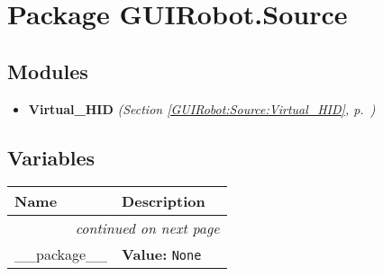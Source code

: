 %
%
%


\section{Package GUIRobot.Source}

    \label{GUIRobot:Source}


\subsection{Modules}

\begin{itemize}
\setlength{\parskip}{0ex}
\item \textbf{Virtual\_HID}
  \textit{(Section \ref{GUIRobot:Source:Virtual_HID}, p.~\pageref{GUIRobot:Source:Virtual_HID})}

\end{itemize}



  \subsection{Variables}

    \vspace{-1cm}
\hspace{\varindent}\begin{longtable}{|p{\varnamewidth}|p{\vardescrwidth}|l}
\cline{1-2}
\cline{1-2} \centering \textbf{Name} & \centering \textbf{Description}& \\
\cline{1-2}
\endhead\cline{1-2}\multicolumn{3}{r}{\small\textit{continued on next page}}\\\endfoot\cline{1-2}
\endlastfoot\raggedright \_\-\_\-p\-a\-c\-k\-a\-g\-e\-\_\-\_\- & \raggedright \textbf{Value:} 
{\tt None}&\\
\cline{1-2}
\end{longtable}

